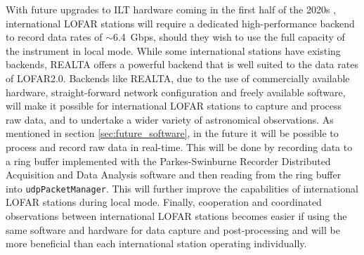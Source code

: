 With future upgrades to ILT hardware coming in the first half of the 2020s \citep[mainly, LOFAR2.0;][]{Edler2021}, international LOFAR stations will require a dedicated high-performance backend to record data rates of $\sim$6.4~Gbps, should they wish to use the full capacity of the instrument in local mode. While some international stations have existing backends, REALTA offers a powerful backend that is well suited to the data rates of LOFAR2.0. Backends like REALTA, due to the use of commercially available hardware, straight-forward network configuration and freely available software, will make it possible for international LOFAR stations to capture and process raw data, and to undertake a wider variety of astronomical observations. As mentioned in section \ref{sec:future_software}, in the future it will be possible to process and record raw data in real-time. This will be done by recording data to a ring buffer implemented with the Parkes-Swinburne Recorder Distributed Acquisition and Data Analysis software \citep[PSRDADA;][]{PSRDADA} and then reading from the ring buffer into \texttt{udpPacketManager}. This will further improve the capabilities of international LOFAR stations during local mode. Finally, cooperation and coordinated observations between international LOFAR stations becomes easier if using the same software and hardware for data capture and post-processing and will be more beneficial than each international station operating individually.
